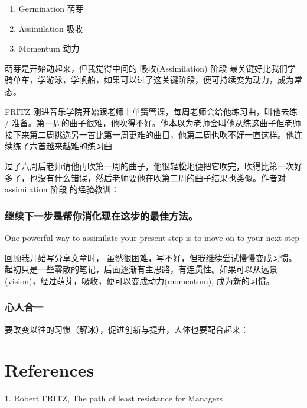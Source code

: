 \begin{enumerate}
\tightlist
\item
  Germination 萌芽
\item
  Assimilation 吸收
\item
  Momentum 动力
\end{enumerate}

萌芽是开始动起来，但我觉得中间的 吸收(Assimilation) 阶段
最关键好比我们学骑单车，学游泳，学帆船，如果可以过了这关键阶段，便可持续变为动力，成为常态。

FRITZ 刚进音乐学院开始跟老师上单簧管课，每周老师会给他练习曲，叫他去练 /
准备。第一周的曲子很难，他吹得不好。他本以为老师会叫他从练这曲子但老师接下来第二周挑选另一首比第一周更难的曲目，他第二周也吹不好一直这样。他连续练了六首越来越难的练习曲

过了六周后老师请他再吹第一周的曲子，他很轻松地便把它吹完，吹得比第一次好多了，也没有什么错误，然后老师要他在吹第二周的曲子结果也类似。作者对
assimilation 阶段 的经验教训：

\hypertarget{ux7ee7ux7eedux4e0bux4e00ux6b65ux662fux5e2eux4f60ux6d88ux5316ux73b0ux5728ux8fd9ux6b65ux7684ux6700ux4f73ux65b9ux6cd5}{%
\subsubsection{继续下一步是帮你消化现在这步的最佳方法。}\label{ux7ee7ux7eedux4e0bux4e00ux6b65ux662fux5e2eux4f60ux6d88ux5316ux73b0ux5728ux8fd9ux6b65ux7684ux6700ux4f73ux65b9ux6cd5}}

One powerful way to assimilate your present step is to move on to your
next step

回顾我开始写分享文章时，
虽然很困难，写不好，但我继续尝试慢慢变成习惯。起初只是一些零散的笔记，后面逐渐有主思路，有连贯性。如果可以从远景(vision)，经过萌芽，吸收，便可以变成动力(momentum),
成为新的习惯。

\hypertarget{ux5fc3ux4ebaux5408ux4e00}{%
\subsubsection{心人合一}\label{ux5fc3ux4ebaux5408ux4e00}}

要改变以往的习惯（解冰），促进创新与提升，人体也要配合起来：



\hypertarget{references}{%
\section{References}\label{references}}

1. Robert FRITZ, The path of least resistance for Managers\\
